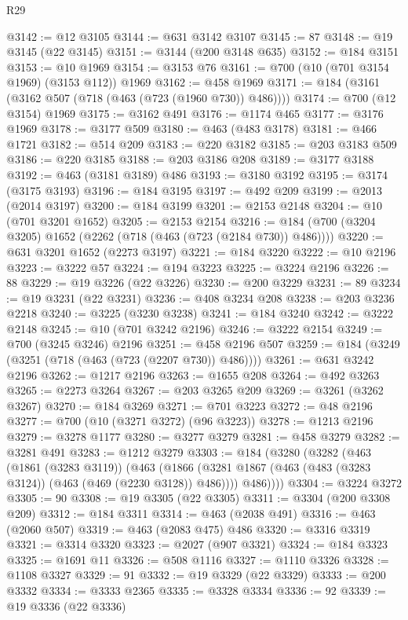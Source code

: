 \begin{lexlean}{R29}
\begin{coremodule}
@3142 := @12 @3105
@3144 := @631 @3142 @3107
@3145 := 87
@3148 := @19 @3145 (@22 @3145)
@3151 := @3144 (@200 @3148 @635)
@3152 := @184 @3151
@3153 := @10 @1969
@3154 := @3153 @76
@3161 := @700 (@10 (@701 @3154 @1969) (@3153 @112)) @1969
@3162 := @458 @1969
@3171 := @184 (@3161 (@3162 @507 (@718 (@463 (@723 (@1960 @730)) @486))))
@3174 := @700 (@12 @3154) @1969
@3175 := @3162 @491
@3176 := @1174 @465
@3177 := @3176 @1969
@3178 := @3177 @509
@3180 := @463 (@483 @3178)
@3181 := @466 @1721
@3182 := @514 @209
@3183 := @220 @3182
@3185 := @203 @3183 @509
@3186 := @220 @3185
@3188 := @203 @3186 @208
@3189 := @3177 @3188
@3192 := @463 (@3181 @3189) @486
@3193 := @3180 @3192
@3195 := @3174 (@3175 @3193)
@3196 := @184 @3195
@3197 := @492 @209
@3199 := @2013 (@2014 @3197)
@3200 := @184 @3199
@3201 := @2153 @2148
@3204 := @10 (@701 @3201 @1652)
@3205 := @2153 @2154
@3216 := @184 (@700 (@3204 @3205) @1652 (@2262 (@718 (@463 (@723 (@2184 @730)) @486))))
@3220 := @631 @3201 @1652 (@2273 @3197)
@3221 := @184 @3220
@3222 := @10 @2196
@3223 := @3222 @57
@3224 := @194 @3223
@3225 := @3224 @2196
@3226 := 88
@3229 := @19 @3226 (@22 @3226)
@3230 := @200 @3229
@3231 := 89
@3234 := @19 @3231 (@22 @3231)
@3236 := @408 @3234 @208
@3238 := @203 @3236 @2218
@3240 := @3225 (@3230 @3238)
@3241 := @184 @3240
@3242 := @3222 @2148
@3245 := @10 (@701 @3242 @2196)
@3246 := @3222 @2154
@3249 := @700 (@3245 @3246) @2196
@3251 := @458 @2196 @507
@3259 := @184 (@3249 (@3251 (@718 (@463 (@723 (@2207 @730)) @486))))
@3261 := @631 @3242 @2196
@3262 := @1217 @2196
@3263 := @1655 @208
@3264 := @492 @3263
@3265 := @2273 @3264
@3267 := @203 @3265 @209
@3269 := @3261 (@3262 @3267)
@3270 := @184 @3269
@3271 := @701 @3223
@3272 := @48 @2196
@3277 := @700 (@10 (@3271 @3272) (@96 @3223))
@3278 := @1213 @2196
@3279 := @3278 @1177
@3280 := @3277 @3279
@3281 := @458 @3279
@3282 := @3281 @491
@3283 := @1212 @3279
@3303 := @184
    (@3280
      (@3282
        (@463
          (@1861 (@3283 @3119))
          (@463
            (@1866 (@3281 @1867 (@463 (@483 (@3283 @3124)) (@463 (@469 (@2230 @3128)) @486))))
            @486))))
@3304 := @3224 @3272
@3305 := 90
@3308 := @19 @3305 (@22 @3305)
@3311 := @3304 (@200 @3308 @209)
@3312 := @184 @3311
@3314 := @463 (@2038 @491)
@3316 := @463 (@2060 @507)
@3319 := @463 (@2083 @475) @486
@3320 := @3316 @3319
@3321 := @3314 @3320
@3323 := @2027 (@907 @3321)
@3324 := @184 @3323
@3325 := @1691 @11
@3326 := @508 @1116
@3327 := @1110 @3326
@3328 := @1108 @3327
@3329 := 91
@3332 := @19 @3329 (@22 @3329)
@3333 := @200 @3332
@3334 := @3333 @2365
@3335 := @3328 @3334
@3336 := 92
@3339 := @19 @3336 (@22 @3336)

\end{coremodule}
\end{lexlean}
